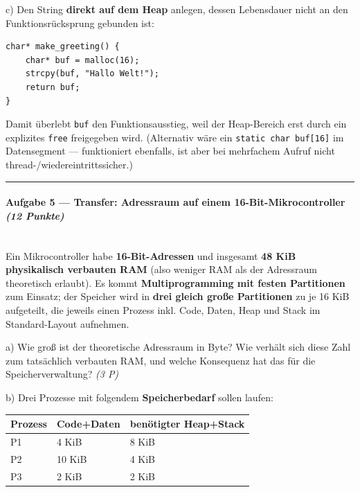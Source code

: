 \documentclass[11pt, a4paper]{article}
\begin{document}
c) Den String \textbf{direkt auf dem Heap} anlegen, dessen Lebensdauer nicht an den Funktionsrücksprung gebunden ist:


\begin{lstlisting}
char* make_greeting() {
    char* buf = malloc(16);
    strcpy(buf, "Hallo Welt!");
    return buf;
}
\end{lstlisting}


Damit überlebt \texttt{buf} den Funktionsausstieg, weil der Heap-Bereich erst durch ein explizites \texttt{free} freigegeben wird. (Alternativ wäre ein \texttt{static char buf[16]} im Datensegment — funktioniert ebenfalls, ist aber bei mehrfachem Aufruf nicht thread-/wiedereintrittssicher.)



\noindent\textcolor{rulegray}{\rule{\linewidth}{0.4pt}}


\paragraph{Aufgabe 5 — Transfer: Adressraum auf einem 16-Bit-Mikrocontroller \textit{(12 Punkte)}}\mbox{}\\[2pt]

Ein Mikrocontroller habe \textbf{16-Bit-Adressen} und insgesamt \textbf{48 KiB physikalisch verbauten RAM} (also weniger RAM als der Adressraum theoretisch erlaubt). Es kommt \textbf{Multiprogramming mit festen Partitionen} zum Einsatz; der Speicher wird in \textbf{drei gleich große Partitionen} zu je 16 KiB aufgeteilt, die jeweils einen Prozess inkl. Code, Daten, Heap und Stack im Standard-Layout aufnehmen.


a) Wie groß ist der theoretische Adressraum in Byte? Wie verhält sich diese Zahl zum tatsächlich verbauten RAM, und welche Konsequenz hat das für die Speicherverwaltung? \textit{(3 P)}


b) Drei Prozesse mit folgendem \textbf{Speicherbedarf} sollen laufen:



{\small
\begin{tabularx}{\linewidth}{XXX}
\hline
\rowcolor{tableheadbg}
{\color{white}\textbf{Prozess}} & {\color{white}\textbf{Code+Daten}} & {\color{white}\textbf{benötigter Heap+Stack}} \\[2pt]
\hline
\endhead
\hline
\endfoot
P1 & 4 KiB & 8 KiB \\
P2 & 10 KiB & 4 KiB \\
P3 & 2 KiB & 2 KiB \\
\end{tabularx}
}
\end{document}
